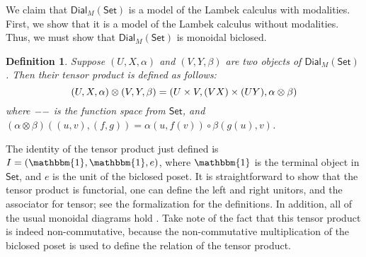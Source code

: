 \documentclass{article}
\let\to\relax                   %
\newcommand{\to}{\rightarrow}
\newcommand{\Set}{\mathsf{Set}}
\newcommand{\Dial}[2]{\mathsf{Dial}_{#1}(#2)}
\newtheorem{definition}[theorem]{Definition}
\begin{document}
We claim that $\Dial{M}{\Set}$ is a model of the Lambek calculus with
modalities.  First, we show that it is a model of the Lambek calculus
without modalities.  Thus, we must show that $\Dial{M}{\Set}$ is
monoidal biclosed.

\begin{definition}
  \label{def:dial-monoidal-structure}
  Suppose $(U, X, \alpha)$ and $(V, Y, \beta)$ are two objects of
  $\Dial{M}{\Set}$. Then their tensor product is defined as follows:
  \[
  (U, X, \alpha) \otimes (V, Y, \beta) = (U \times V, (V \to X) \times (U \to Y), \alpha \otimes \beta)
  \]
  where $- \to -$ is the function space from $\Set$, and $(\alpha
  \otimes \beta)((u, v), (f, g)) = \alpha(u, f(v)) \circ \beta(g(u), v)$.
\end{definition}

\noindent
The identity of the tensor product just defined is $I = (\mathbbm{1},
\mathbbm{1}, e)$, where $\mathbbm{1}$ is the terminal object in
$\Set$, and $e$ is the unit of the biclosed poset.  It is
straightforward to show that the tensor product is functorial, one can
define the left and right unitors, and the associator for tensor; see
the formalization for the definitions.  In addition, all of the usual
monoidal diagrams hold \cite{depaiva1990}.  Take note of the fact that
this tensor product is indeed non-commutative, because the
non-commutative multiplication of the biclosed poset is used to define
the relation of the tensor product.
\end{document}
